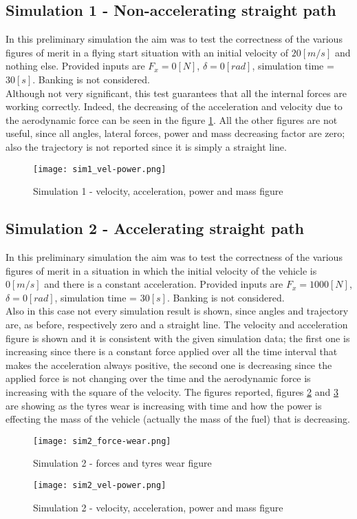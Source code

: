 \documentclass{report}
\let\Oldsubsection\subsection
\renewcommand{\subsection}{\FloatBarrier\Oldsubsection}
\begin{document}
\subsection{Simulation 1 - Non-accelerating straight path}
In this preliminary simulation the aim was to test the correctness of the various figures of merit in a flying start situation with an initial velocity of $20[m/s]$ and nothing else. Provided inputs are $F_x = 0 [N]$, $\delta = 0 [rad]$, simulation time = $30 [s]$. Banking is not considered. 
\\Although not very significant, this test guarantees that all the internal forces are working correctly. Indeed, the decreasing of the acceleration and velocity due to the aerodynamic force can be seen in the figure \ref{fig:sim1_1}. All the other figures are not useful, since all angles, lateral forces, power and mass decreasing factor are zero; also the trajectory is not reported since it is simply a straight line. \\

\begin{figure}[h!]
    \centering
    \texttt{[image: sim1\_vel-power.png]}
    \caption{Simulation 1 - velocity, acceleration, power and mass figure}
    \label{fig:sim1_1}
\end{figure}

\subsection{Simulation 2 - Accelerating straight path}
In this preliminary simulation the aim was to test the correctness of the various figures of merit in a situation in which the initial velocity of the vehicle is $0[m/s]$ and there is a constant acceleration. Provided inputs are $F_x = 1000 [N]$, $\delta = 0 [rad]$, simulation time = $30 [s]$. Banking is not considered.
\\Also in this case not every simulation result is shown, since angles and trajectory are, as before, respectively zero and a straight line. The velocity and acceleration figure is shown and it is consistent with the given simulation data; the first one is increasing since there is a constant force applied over all the time interval that makes the acceleration always positive, the second one is decreasing since the applied force is not changing over the time and the aerodynamic force is increasing with the square of the velocity. The figures reported, figures \ref{fig:sim2_1} and \ref{fig:sim2_2} are showing as the tyres wear is increasing with time and how the power is effecting the mass of the vehicle (actually the mass of the fuel) that is decreasing.\\ 
\begin{figure}[h!]
    \centering
    \texttt{[image: sim2\_force-wear.png]}
    \caption{Simulation 2 - forces and tyres wear figure}
    \label{fig:sim2_1}
\end{figure}
\begin{figure}[h!]
    \centering
    \texttt{[image: sim2\_vel-power.png]}
    \caption{Simulation 2 - velocity, acceleration, power and mass figure}
    \label{fig:sim2_2}
\end{figure}
\end{document}
